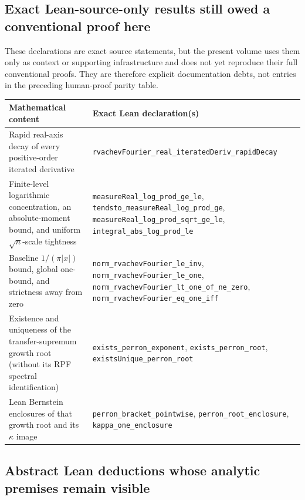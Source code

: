\documentclass[11pt,oneside]{article}
\numberwithin{equation}{section}
\theoremstyle{definition}
\theoremstyle{remark}
\newcommand{\decl}[1]{\nolinkurl{#1}}
\begin{document}
\subsection[Lean-source-only proof debts]
{Exact Lean-source-only results still owed a conventional proof here}

These declarations are exact source statements, but the present volume uses them only as
context or supporting infrastructure and does not yet reproduce their full conventional
proofs.  They are therefore explicit documentation debts, not entries in the preceding
human-proof parity table.

\begin{longtable}{@{}p{}p{}@{}}
\toprule
Mathematical content & Exact Lean declaration(s)\\
\midrule
\endhead
Rapid real-axis decay of every positive-order iterated derivative
 & \decl{rvachevFourier_real_iteratedDeriv_rapidDecay}\\
Finite-level logarithmic concentration, an absolute-moment bound, and uniform
$\sqrt n$-scale tightness
 & \decl{measureReal_log_prod_ge_le}, \decl{tendsto_measureReal_log_prod_ge},
   \decl{measureReal_log_prod_sqrt_ge_le},
   \decl{integral_abs_log_prod_le}\\
Baseline $1/(\pi|x|)$ bound, global one-bound, and strictness away from zero
 & \decl{norm_rvachevFourier_le_inv}, \decl{norm_rvachevFourier_le_one},
   \decl{norm_rvachevFourier_lt_one_of_ne_zero},
   \decl{norm_rvachevFourier_eq_one_iff}\\
Existence and uniqueness of the transfer-supremum growth root (without its RPF spectral
identification)
 & \decl{exists_perron_exponent}, \decl{exists_perron_root},
   \decl{existsUnique_perron_root}\\
Lean Bernstein enclosures of that growth root and its $\kappa$ image
 & \decl{perron_bracket_pointwise}, \decl{perron_root_enclosure},
   \decl{kappa_one_enclosure}\\
\bottomrule
\end{longtable}

\subsection{Abstract Lean deductions whose analytic premises remain visible}
\end{document}
